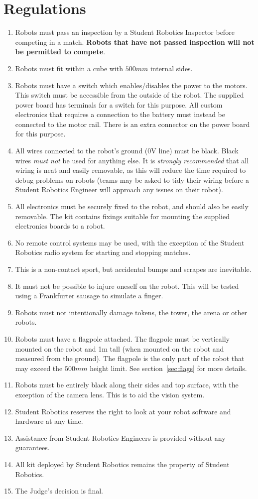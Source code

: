 \section {Regulations}
\label{regs}

\begin{enumerate}
\item Robots must pass an inspection by a Student Robotics Inspector before competing in a match.
 \textbf{Robots that have not passed inspection will not be permitted to compete}.
\item Robots must fit within a cube with $500mm$ internal sides.
\item Robots must have a switch which enables/disables the power to the motors.
 This switch must be accessible from the outside of the robot.
 The supplied power board has terminals for a switch for this purpose.
 All custom electronics that requires a connection to the battery must instead be connected to the motor rail.
 There is an extra connector on the power board for this purpose.
\item All wires connected to the robot's ground (0V line) must be black.
 Black wires \emph{must not} be used for anything else.
 It is \emph{strongly recommended} that all wiring is neat and easily removable, as this will reduce the time required to debug problems on robots (teams may be asked to tidy their wiring before a Student Robotics Engineer will approach any issues on their robot).
\item All electronics must be securely fixed to the robot, and should also be easily removable.
 The kit contains fixings suitable for mounting the supplied electronics boards to a robot.
\item No remote control systems may be used, with the exception of the Student Robotics radio system for starting and stopping matches.
\item This is a non-contact sport, but accidental bumps and scrapes are inevitable.
\item It must not be possible to injure oneself on the robot.
 This will be tested using a Frankfurter sausage to simulate a finger.
\item Robots must not intentionally damage tokens, the tower, the arena or other robots.
\item Robots must have a flagpole attached.
 The flagpole must be vertically mounted on the robot and 1m tall (when mounted on the robot and measured from the ground).
 The flagpole is the only part of the robot that may exceed the $500mm$ height limit.
 See section~\ref{sec:flags} for more details.
\item Robots must be entirely black along their sides and top surface, with the exception of the camera lens.
 This is to aid the vision system.
\item Student Robotics reserves the right to look at your robot software and hardware at any time.
\item Assistance from Student Robotics Engineers is provided without any guarantees.
\item All kit deployed by Student Robotics remains the property of Student Robotics.
\item The Judge's decision is final.


\end{enumerate}
